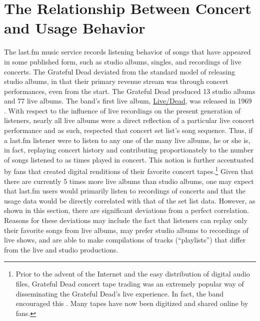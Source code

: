 \documentclass{svmult}
\newcommand{\album}[1]{\uline{#1}}
\begin{document}
\section{The Relationship Between Concert and Usage Behavior\label{sec:both}}

The last.fm music service records listening behavior of songs that have appeared in some published form, such as studio albums, singles, and recordings of live concerts. The Grateful Dead deviated from the standard model of releasing studio albums, in that their primary revenue stream was through concert performances, even from the start. The Grateful Dead produced 13 studio albums and 77 live albums.  The band's first live album, \album{Live/Dead}, was released in 1969 \cite{livedead:dead1969}.  With respect to the influence of live recordings on the present generation of listeners, nearly all live albums were a direct reflection of a particular live concert performance and as such, respected that concert set list's song sequence. Thus, if a last.fm listener were to listen to any one of the many live albums, he or she is, in fact, replaying concert history and contributing proportionately to the number of songs listened to as times played in concert. This notion is further accentuated by fans that created digital renditions of their favorite concert tapes.\footnote{Prior to the advent of the Internet and the easy distribution of digital audio files, Grateful Dead concert tape trading was an extremely popular way of disseminating the Grateful Dead's live experience. In fact, the band encouraged this \cite{tapers:dwork1998}. Many tapes have now been digitized and shared online by fans.} Given that there are currently 5 times more live albums than studio albums, one may expect that last.fm users would primarily listen to recordings of concerts and that the usage data would be directly correlated with that of the set list data.  However, as shown in this section, there are significant deviations from a perfect correlation.  Reasons for these deviations may include the fact that listeners can replay only their favorite songs from live albums, may prefer studio albums to recordings of live shows, and are able to make compilations of tracks (``playlists'') that differ from the live and studio productions. 
\end{document}
